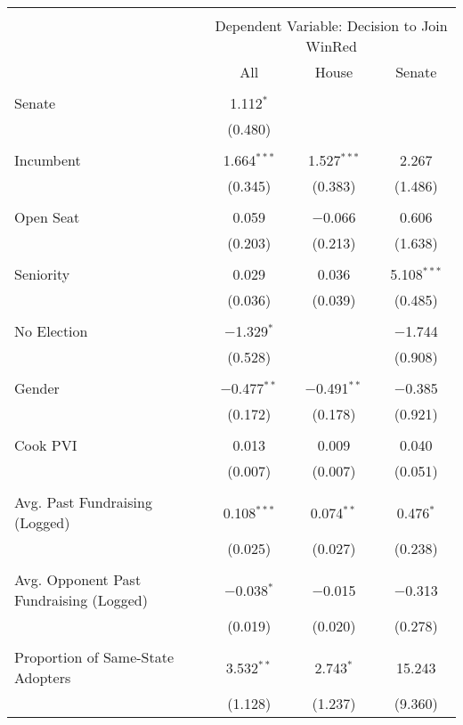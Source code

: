 
\begin{tabular}{@{\extracolsep{5pt}}lccc} 
\\[-1.8ex]\hline 
\hline \\[-1.8ex] 
 & \multicolumn{3}{c}{Dependent Variable: Decision to Join WinRed} \\ 
\cline{2-4} 
 & All & House & Senate \\ 
\hline \\[-1.8ex] 
 Senate & 1.112$^{*}$ &  &  \\ 
  & (0.480) &  &  \\ 
  & & & \\ 
 Incumbent & 1.664$^{***}$ & 1.527$^{***}$ & 2.267 \\ 
  & (0.345) & (0.383) & (1.486) \\ 
  & & & \\ 
 Open Seat & 0.059 & $-$0.066 & 0.606 \\ 
  & (0.203) & (0.213) & (1.638) \\ 
  & & & \\ 
 Seniority & 0.029 & 0.036 & 5.108$^{***}$ \\ 
  & (0.036) & (0.039) & (0.485) \\ 
  & & & \\ 
 No Election & $-$1.329$^{*}$ &  & $-$1.744 \\ 
  & (0.528) &  & (0.908) \\ 
  & & & \\ 
 Gender & $-$0.477$^{**}$ & $-$0.491$^{**}$ & $-$0.385 \\ 
  & (0.172) & (0.178) & (0.921) \\ 
  & & & \\ 
 Cook PVI & 0.013 & 0.009 & 0.040 \\ 
  & (0.007) & (0.007) & (0.051) \\ 
  & & & \\ 
 Avg. Past Fundraising (Logged) & 0.108$^{***}$ & 0.074$^{**}$ & 0.476$^{*}$ \\ 
  & (0.025) & (0.027) & (0.238) \\ 
  & & & \\ 
 Avg. Opponent Past Fundraising (Logged) & $-$0.038$^{*}$ & $-$0.015 & $-$0.313 \\ 
  & (0.019) & (0.020) & (0.278) \\ 
  & & & \\ 
 Proportion of Same-State Adopters & 3.532$^{**}$ & 2.743$^{*}$ & 15.243 \\ 
  & (1.128) & (1.237) & (9.360) \\ 

\end{tabular}
